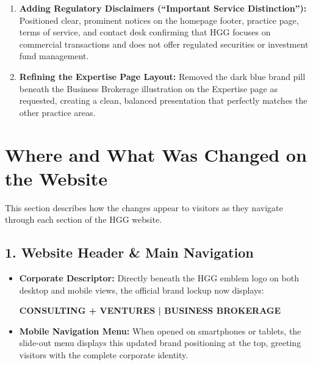 \documentclass[11pt,a4paper]{article}
\begin{document}
\begin{ExecutiveSummaryBox}
\begin{enumerate}[leftmargin=*,noitemsep,topsep=2pt]
    \item \textbf{Adding Regulatory Disclaimers (``Important Service Distinction''):} Positioned clear, prominent notices on the homepage footer, practice page, terms of service, and contact desk confirming that HGG focuses on commercial transactions and does not offer regulated securities or investment fund management.
    \item \textbf{Refining the Expertise Page Layout:} Removed the dark blue brand pill beneath the Business Brokerage illustration on the Expertise page as requested, creating a clean, balanced presentation that perfectly matches the other practice areas.
\end{enumerate}
\end{ExecutiveSummaryBox}

\newpage

\section{Where and What Was Changed on the Website}

This section describes how the changes appear to visitors as they navigate through each section of the HGG website.

\subsection{1. Website Header \& Main Navigation}
\begin{itemize}[leftmargin=*]
    \item \textbf{Corporate Descriptor:} Directly beneath the HGG emblem logo on both desktop and mobile views, the official brand lockup now displays:
    \begin{center}
    \textbf{\color{HGGNavy}CONSULTING + VENTURES \color{HGGGold}| \color{HGGNavy}BUSINESS BROKERAGE}
    \end{center}
    \item \textbf{Mobile Navigation Menu:} When opened on smartphones or tablets, the slide-out menu displays this updated brand positioning at the top, greeting visitors with the complete corporate identity.
\end{itemize}
\end{document}
